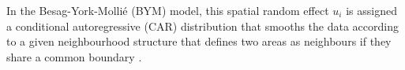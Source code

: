In the Besag-York-Mollié (BYM) \autocite[][]{besag1991bayesian} model, this spatial random effect $u_i$ is assigned a conditional autoregressive (CAR) distribution that smooths the data according to a given neighbourhood structure that defines two areas as neighbours if they share a common boundary \autocite[][]{moraga2019geospatial}.
